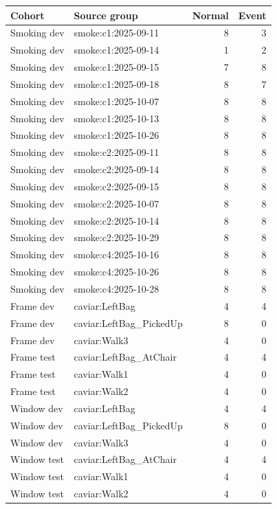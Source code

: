 \begin{longtable}{llrr}
\toprule
Cohort & Source group & Normal & Event \\
\midrule\endhead
Smoking dev & smoke:c1:2025-09-11 & 8 & 3 \\
Smoking dev & smoke:c1:2025-09-14 & 1 & 2 \\
Smoking dev & smoke:c1:2025-09-15 & 7 & 8 \\
Smoking dev & smoke:c1:2025-09-18 & 8 & 7 \\
Smoking dev & smoke:c1:2025-10-07 & 8 & 8 \\
Smoking dev & smoke:c1:2025-10-13 & 8 & 8 \\
Smoking dev & smoke:c1:2025-10-26 & 8 & 8 \\
Smoking dev & smoke:c2:2025-09-11 & 8 & 8 \\
Smoking dev & smoke:c2:2025-09-14 & 8 & 8 \\
Smoking dev & smoke:c2:2025-09-15 & 8 & 8 \\
Smoking dev & smoke:c2:2025-10-07 & 8 & 8 \\
Smoking dev & smoke:c2:2025-10-14 & 8 & 8 \\
Smoking dev & smoke:c2:2025-10-29 & 8 & 8 \\
Smoking dev & smoke:c4:2025-10-16 & 8 & 8 \\
Smoking dev & smoke:c4:2025-10-26 & 8 & 8 \\
Smoking dev & smoke:c4:2025-10-28 & 8 & 8 \\
Frame dev & caviar:LeftBag & 4 & 4 \\
Frame dev & caviar:LeftBag\_PickedUp & 8 & 0 \\
Frame dev & caviar:Walk3 & 4 & 0 \\
Frame test & caviar:LeftBag\_AtChair & 4 & 4 \\
Frame test & caviar:Walk1 & 4 & 0 \\
Frame test & caviar:Walk2 & 4 & 0 \\
Window dev & caviar:LeftBag & 4 & 4 \\
Window dev & caviar:LeftBag\_PickedUp & 8 & 0 \\
Window dev & caviar:Walk3 & 4 & 0 \\
Window test & caviar:LeftBag\_AtChair & 4 & 4 \\
Window test & caviar:Walk1 & 4 & 0 \\
Window test & caviar:Walk2 & 4 & 0 \\
\bottomrule
\end{longtable}

